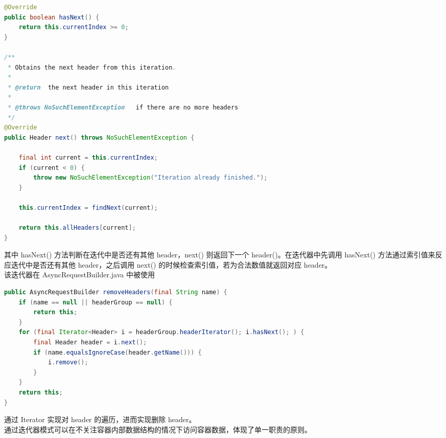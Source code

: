 \documentclass{article}
\begin{document}
	\begin{lstlisting}[language={java}]
@Override
public boolean hasNext() {
    return this.currentIndex >= 0;
}

/**
 * Obtains the next header from this iteration.
 *
 * @return  the next header in this iteration
 *
 * @throws NoSuchElementException   if there are no more headers
 */
@Override
public Header next() throws NoSuchElementException {

    final int current = this.currentIndex;
    if (current < 0) {
        throw new NoSuchElementException("Iteration already finished.");
    }

    this.currentIndex = findNext(current);

    return this.allHeaders[current];
}
	\end{lstlisting}
	\begin{CJK}{UTF8}{gbsn}
		\indent \indent  其中 hasNext() 方法判断在迭代中是否还有其他 header，next() 则返回下一个 header()。在迭代器中先调用 hasNext() 方法通过索引值来反应迭代中是否还有其他 header，之后调用 next() 的时候检查索引值，若为合法数值就返回对应 header。\\
		\indent 该迭代器在 AsyncRequestBuilder.java 中被使用
	\end{CJK}{}
	\begin{lstlisting}[language={java}]
public AsyncRequestBuilder removeHeaders(final String name) {
    if (name == null || headerGroup == null) {
        return this;
    }
    for (final Iterator<Header> i = headerGroup.headerIterator(); i.hasNext(); ) {
        final Header header = i.next();
        if (name.equalsIgnoreCase(header.getName())) {
            i.remove();
        }
    }
    return this;
}
	\end{lstlisting}
	\begin{CJK}{UTF8}{gbsn}
		\indent \indent 通过 Iterator 实现对 header 的遍历，进而实现删除 header。\\
		\indent 通过迭代器模式可以在不关注容器内部数据结构的情况下访问容器数据，体现了单一职责的原则。
	\end{CJK}{}
\end{document}
